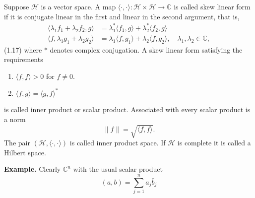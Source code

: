 Suppose $\mathcal{H}$ is a vector space. A map $\langle \cdot, \cdot \rangle: \mathcal{H} \times \mathcal{H} \to \mathbb{C}$ is called skew
linear form if it is conjugate linear in the first and linear in the second
argument, that is,
\begin{align*}
\langle \lambda_1 f_1 + \lambda_2 f_2, g \rangle &= \lambda_1^* \langle f_1, g \rangle + \lambda_2^* \langle f_2, g \rangle \\
\langle f, \lambda_1 g_1 + \lambda_2 g_2 \rangle &= \lambda_1 \langle f, g_1 \rangle + \lambda_2 \langle f, g_2 \rangle, \quad \lambda_1, \lambda_2 \in \mathbb{C},
\end{align*}
(1.17)
where $*$ denotes complex conjugation. A skew linear form satisfying the
requirements
\begin{enumerate}
    \item $\langle f, f \rangle > 0$ for $f \neq 0$.
    \item $\langle f, g \rangle = \langle g, f \rangle^*$
\end{enumerate}
is called inner product or scalar product. Associated with every scalar
product is a norm
\[
\|f\| = \sqrt{\langle f, f \rangle}.
\tag{1.18}
\]
The pair $(\mathcal{H}, \langle \cdot, \cdot \rangle)$ is called inner product space. If $\mathcal{H}$ is complete it is
called a Hilbert space.

\noindent\textbf{Example.} Clearly $\mathbb{C}^n$ with the usual scalar product
\[
(a,b) = \sum_{j=1}^n a_j \bar{b}_j
\tag{1.19}
\]